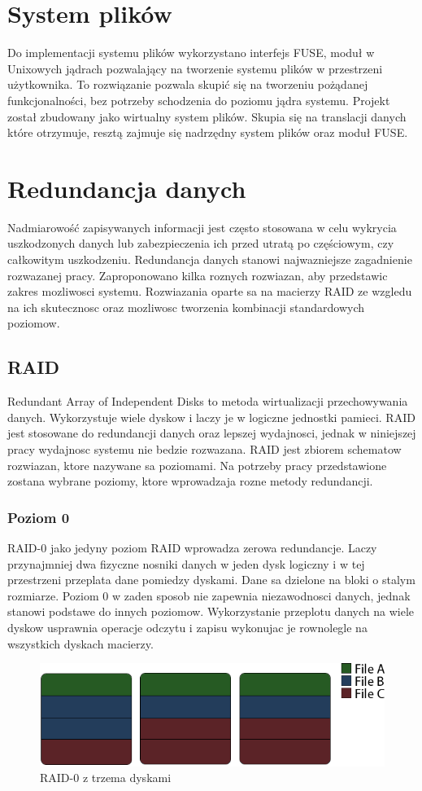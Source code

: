 \section{System plików}
Do implementacji systemu plików wykorzystano interfejs FUSE, moduł w Unixowych jądrach pozwalający na tworzenie systemu plików w przestrzeni użytkownika. To rozwiązanie pozwala skupić się na tworzeniu pożądanej funkcjonalności, bez potrzeby schodzenia do poziomu jądra systemu. Projekt został zbudowany jako wirtualny system plików. Skupia się na translacji danych które otrzymuje, resztą zajmuje się nadrzędny system plików oraz moduł FUSE. 

\section {Redundancja danych}
Nadmiarowość zapisywanych informacji jest często stosowana w celu wykrycia uszkodzonych danych lub zabezpieczenia ich przed utratą po częściowym, czy całkowitym uszkodzeniu.
Redundancja danych stanowi najwazniejsze zagadnienie rozwazanej pracy. Zaproponowano kilka roznych rozwiazan, aby przedstawic zakres mozliwosci systemu. Rozwiazania oparte sa na macierzy RAID ze wzgledu na ich skutecznosc oraz mozliwosc tworzenia kombinacji standardowych poziomow.

\subsection {RAID}
Redundant Array of Independent Disks to metoda wirtualizacji przechowywania danych. Wykorzystuje wiele dyskow i laczy je w logiczne jednostki pamieci. RAID jest stosowane do redundancji danych oraz lepszej wydajnosci, jednak w niniejszej pracy wydajnosc systemu nie bedzie rozwazana.  
RAID jest zbiorem schematow rozwiazan, ktore nazywane sa poziomami. Na potrzeby pracy przedstawione zostana wybrane poziomy, ktore wprowadzaja rozne metody redundancji.
\subsubsection{Poziom 0}
RAID-0 jako jedyny poziom RAID wprowadza zerowa redundancje. Laczy przynajmniej dwa fizyczne nosniki danych w jeden dysk logiczny i w tej przestrzeni przeplata dane pomiedzy dyskami. Dane sa dzielone na bloki o stalym rozmiarze. Poziom 0 w zaden sposob nie zapewnia niezawodnosci danych, jednak stanowi podstawe do innych poziomow. Wykorzystanie przeplotu danych na wiele dyskow usprawnia operacje odczytu i zapisu wykonujac je rownolegle na wszystkich dyskach macierzy.
\begin{figure}[h!]
        \centering
        \includegraphics[scale=0.8]{raid-0.png}
        \caption{RAID-0 z trzema dyskami}
        \label{fig:raid0}
\end{figure}
\newpage
